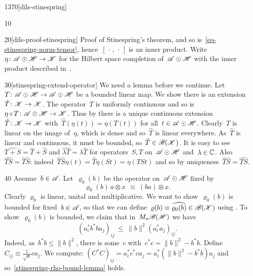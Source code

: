 \begin{parsec}{1370}[dils-stinespring]
\begin{point}{10}
\begin{point}{20}[dils-proof-stinespring]{%
    Proof of Stinespring's theorem, }
    and so is~\eqref{eq-stinespring-norm-tensor},
    hence~$[\,\cdot\,,\,\cdot\,]$ is an inner product.
Write~$\eta\colon \mathscr{A}\odot \mathscr{H} \to \mathscr{K}$ for the Hilbert space completion
    of~$\mathscr{A} \odot \mathscr{H}$ with the inner product
    described in~.
\begin{point}{30}[stinespring-extend-operator]%
We need a lemma before we continue.
Let~$T\colon \mathscr{A} \odot \mathscr{H} \to \mathscr{A} \odot \mathscr{H}$
be a bounded linear map.
We show there is an extension~$\hat{T} \colon \mathscr{K} \to \mathscr{K}$.
The operator~$T$ is
uniformly continuous and so is~$\eta\mathop{\circ} T \colon \mathscr{A}\odot\mathscr{H} \to\mathscr{K}$.
Thus by 
there is a unique continuous extension~$\hat{T} \colon \mathscr{K} \to \mathscr{K}$
with~$\hat{T}(\eta(t)) = \eta(T(t))$
    for all~$t \in \mathscr{A}\odot\mathscr{H}$.
Clearly~$\hat{T}$ is linear on the image of~$\eta$,
    which is dense and so~$\hat{T}$ is linear everywhere.
As~$\hat{T}$ is linear and continuous, it must be
    bounded, so~$\hat{T} \in \mathscr{B}(\mathscr{K})$.
It is easy to see~$\widehat{T+S}=\hat{T}+\hat{S}$ and
    $\widehat{\lambda T} = \lambda \hat{T}$
    for operators~$S,T$ on~$\mathscr{A} \odot \mathscr{H}$ and~$\lambda \in \mathbb{C}$.
Also~$\widehat{TS} = \hat{T}\hat{S}$:
indeed~$\hat{T}\hat{S} \eta(t)
            = \hat{T} \eta(St)
            = \eta(TSt)$
    and so by uniqueness~$\hat{T}\hat{S} = \widehat{TS}$.
\end{point}
\begin{point}{40}%
    Assume~$b\in \mathscr{A}$.
    Let~$\varrho_0(b)$ be the operator on~$\mathscr{A} \odot \mathscr{H}$
    fixed by
\begin{equation*}
    \varrho_0(b)\, a\otimes x\, \  \equiv\  (b a) \otimes x.
\end{equation*}
Clearly $\varrho_0$ is linear, unital and multiplicative.
We want to show~$\varrho_0(b)$ is bounded for fixed~$b \in \mathscr{A}$,
    so that we can define~$\varrho(b) \equiv \widehat{\varrho_0(b)}
            \in \mathscr{B}(\mathscr{K})$ using .
    To show~$\varrho_0(b)$ is bounded, we claim that in~$M_n\mathscr{B}(\mathscr{H})$
we have
\begin{equation}\label{stinespring-rho-bound-lemma}
(a_i^*b^*ba_j)_{ij} \ \leq\  \|b\|^2 (a_i^*a_j)_{ij}.
\end{equation}
Indeed, as~$b^*b \leq \|b\|^2$,
    there is some~$c$ with~$c^*c = \|b\|^2 - b^*b$.
Define~$C_{ij} \equiv \frac{1}{\sqrt{n}} ca_j$.
We compute:
$ (C^*C)_{ij} = a_i^*c^*ca_j = a_i^* (\|b\|^2 - b^*b) a_j$
and so~\eqref{stinespring-rho-bound-lemma} holds.

\end{point}
\end{point}
\end{point}
\end{parsec}
